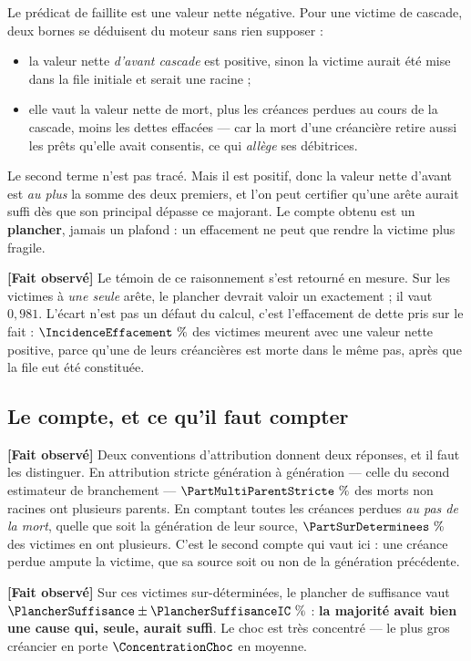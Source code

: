 \documentclass[11pt,a4paper]{article}
\newcommand{\fait}{\textbf{[Fait observé]}}
\begin{document}
Le prédicat de faillite est une valeur nette négative. Pour une victime de
cascade, deux bornes se déduisent du moteur sans rien supposer :

\begin{itemize}
\item la valeur nette \emph{d'avant cascade} est positive, sinon la victime
      aurait été mise dans la file initiale et serait une racine ;
\item elle vaut la valeur nette de mort, plus les créances perdues au cours
      de la cascade, moins les dettes effacées --- car la mort d'une
      créancière retire aussi les prêts qu'elle avait consentis, ce qui
      \emph{allège} ses débitrices.
\end{itemize}

Le second terme n'est pas tracé. Mais il est positif, donc la valeur nette
d'avant est \emph{au plus} la somme des deux premiers, et l'on peut
certifier qu'une arête aurait suffi dès que son principal dépasse ce
majorant. Le compte obtenu est un \textbf{plancher}, jamais un plafond : un
effacement ne peut que rendre la victime plus fragile.

\fait{} Le témoin de ce raisonnement s'est retourné en mesure. Sur les
victimes à \emph{une seule} arête, le plancher devrait valoir un exactement ;
il vaut $0{,}981$. L'écart n'est pas un défaut du calcul, c'est l'effacement
de dette pris sur le fait : $\IncidenceEffacement~\%$ des victimes meurent
avec une valeur nette positive, parce qu'une de leurs créancières est morte
dans le même pas, après que la file eut été constituée.

\subsection{Le compte, et ce qu'il faut compter}

\fait{} Deux conventions d'attribution donnent deux réponses, et il faut les
distinguer. En attribution stricte génération à génération --- celle du
second estimateur de branchement --- $\PartMultiParentStricte~\%$ des morts
non racines ont plusieurs parents. En comptant toutes les créances perdues
\emph{au pas de la mort}, quelle que soit la génération de leur source,
$\PartSurDeterminees~\%$ des victimes en ont plusieurs. C'est le second
compte qui vaut ici : une créance perdue ampute la victime, que sa source
soit ou non de la génération précédente.

\fait{} Sur ces victimes sur-déterminées, le plancher de suffisance vaut
$\PlancherSuffisance \pm \PlancherSuffisanceIC~\%$ : \textbf{la majorité
avait bien une cause qui, seule, aurait suffi}. Le choc est très concentré
--- le plus gros créancier en porte $\ConcentrationChoc$ en moyenne.
\end{document}
